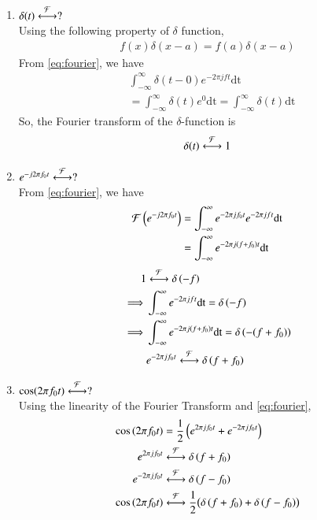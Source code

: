 \documentclass[journal,12pt,twocolumn]{IEEEtran}
\renewcommand\thesection{\arabic{section}}
\begin{document}
\begin{enumerate}[label=\thesection.\arabic*
,ref=\thesection.\theenumi]
\item $\delta(t)\overset{\mathcal{F}}{ \longleftrightarrow}?$ \\
\solution
Using the following property of $\delta$ function, 
\begin{align}
	f(x) \delta(x - a) = f(a) \delta(x-a)
\end{align}
From \eqref{eq:fourier}, we have 
\begin{align}
	&\int_{-\infty}^{\infty} \delta(t - 0) e^{-2 \pi jft} \text{dt} \\
	&= \int_{-\infty}^{\infty} \delta(t) e^{0} \text{dt} = \int_{-\infty}^{\infty} \delta(t) \text{dt} 
\end{align}
So, the Fourier transform of the $\delta$-function is 
\begin{equation}
	\delta(t) \overset{\mathcal{F}}{ \longleftrightarrow} 1
\end{equation}


\item $e^{-j2\pi f_0t}\overset{\mathcal{F}}{ \longleftrightarrow}?$ \\
\solution
From \eqref{eq:fourier}, we have 
\begin{align}
	\mathcal{F}\left(e^{-j2\pi f_0t}\right)&=\int_{-\infty}^{\infty} e^{-2 \pi j f_0 t} e^{-2 \pi jft} \text{dt}\\
	&=\int_{-\infty}^{\infty} e^{-2 \pi j \left(f + f_0\right) t} \text{dt}
\end{align}
\begin{align}
	1 &\overset{\mathcal{F}}{ \longleftrightarrow} \delta\left(-f\right) \\
	\implies &\int_{-\infty}^{\infty} e^{-2 \pi jft} \text{dt} = \delta\left(-f\right) \\
	\implies &\int_{-\infty}^{\infty} e^{-2 \pi j\left(f + f_0\right) t} \text{dt} = \delta\left(-(f + f_0)\right) \\
		 &e^{-2 \pi j f_0 t} \overset{\mathcal{F}}{ \longleftrightarrow} \delta\left(f + f_0\right)
\end{align}


\item $\cos(2\pi f_0t)\overset{\mathcal{F}}{ \longleftrightarrow}?$ \\
\solution Using the linearity of the Fourier 
Transform and \eqref{eq:fourier},
\begin{align}
	\cos\left(2\pi f_0t\right) &= \frac{1}{2} \left(e^{2\pi j f_0t} + e^{-2\pi j f_0t}\right) \\
	e^{2 \pi j f_0 t} &\overset{\mathcal{F}}{ \longleftrightarrow}\delta\left(f+f_0\right) \\
	e^{-2 \pi j f_0 t} &\overset{\mathcal{F}}{ \longleftrightarrow}\delta\left(f-f_0\right) \\
	\cos\left(2 \pi f_0t\right) &\overset{\mathcal{F}}{ \longleftrightarrow}\frac{1}{2} \bigl(\delta\left(f + f_0\right) + \delta\left(f - f_0\right)\bigr)
\end{align}



\end{enumerate}
\end{document}
